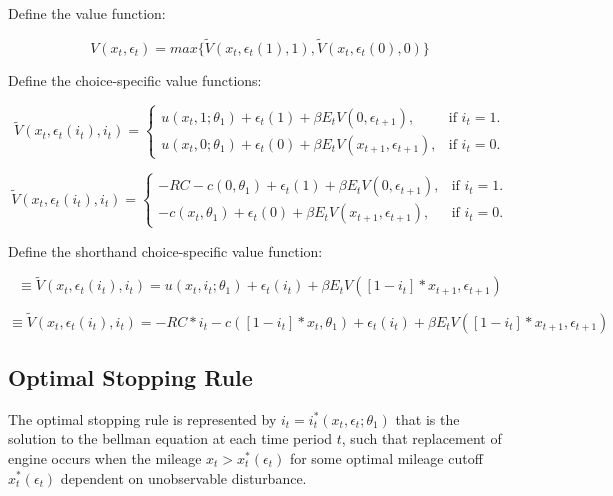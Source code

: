 \documentclass{article}
\begin{document}
\noindent Define the value function:

\begin{equation}
V( x_t, \epsilon_t ) = max \{ \tilde{V} ( x_t, \epsilon_t(1), 1 ), \tilde{V} ( x_t, \epsilon_t(0), 0 ) \}
\end{equation}

\noindent Define the choice-specific value functions:

\begin{equation}
  \tilde{V} ( x_t,\epsilon_t( i_t ),  i_t ) =\begin{cases}
    u( x_t, 1; \theta_1 ) + \epsilon_t( 1 ) + \beta E_t V ( 0, \epsilon_{ t+1 } ), & \text{if $i_t=1$}.\\
    u( x_t, 0; \theta_1 ) + \epsilon_t( 0 ) + \beta E_t V ( x_{ t+1 }, \epsilon_{ t+1 } ), & \text{if $i_t=0$}.
  \end{cases}
\end{equation}

\begin{equation}
  \tilde{V} ( x_t,\epsilon_t( i_t ),  i_t ) =\begin{cases}
    -RC -c( 0, \theta_1 ) + \epsilon_t( 1 ) + \beta E_t V ( 0, \epsilon_{ t+1 } ), & \text{if $i_t=1$}.\\
    -c( x_t, \theta_1 ) + \epsilon_t( 0 ) + \beta E_t V ( x_{ t+1 }, \epsilon_{ t+1 } ), & \text{if $i_t=0$}.
  \end{cases}
\end{equation}

\noindent Define the shorthand choice-specific value function:

\begin{equation}
\equiv \tilde{V} (x_t, \epsilon_t( i_t ), i_t ) = u( x_t, i_t; \theta_1 ) + \epsilon_t( i_t ) + \beta E_t V ( [ 1 - i_t ] * x_{ t+1 }, \epsilon_{ t+1 } )
\end{equation}

\begin{equation}
\equiv \tilde{V} (x_t, \epsilon_t( i_t ), i_t ) = -RC * i_t - c( [ 1 - i_t ] * x_t, \theta_1 ) + \epsilon_t( i_t ) + \beta E_t V ( [ 1 - i_t ] * x_{ t+1 }, \epsilon_{ t+1 } )
\end{equation}

\subsection{Optimal Stopping Rule}

The optimal stopping rule is represented by $i_t = i_t^* ( x_t, \epsilon_t; \theta_1 )$ that is the solution to the bellman equation at each time period $t$, such that replacement of engine occurs when the mileage $x_t>x^*_t( \epsilon_t )$ for some optimal mileage cutoff $x^*_t( \epsilon_t )$ dependent on unobservable disturbance.
\end{document}
